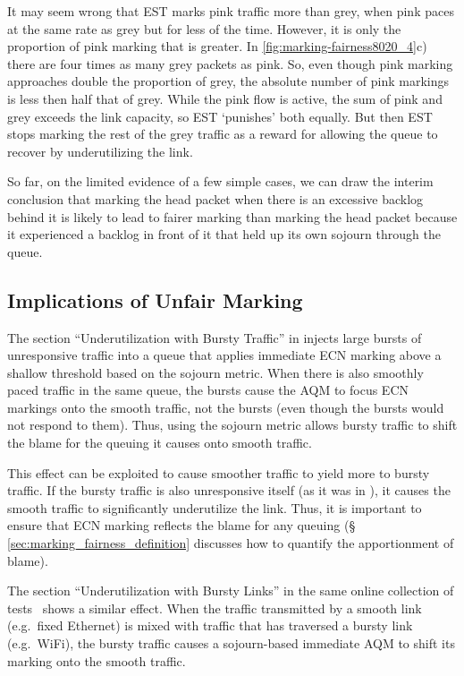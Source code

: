 It may seem wrong that EST marks pink traffic more than grey, when pink paces at the same rate as grey but for less of the time. However, it is only the proportion of pink marking that is greater. In \autoref{fig:marking-fairness8020_4}c) there are four times as many grey packets as pink. So, even though pink marking approaches double the proportion of grey, the absolute number of pink markings is less then half that of grey. While the pink flow is active, the sum of pink and grey exceeds the link capacity, so EST `punishes' both equally. But then EST stops marking the rest of the grey traffic as a reward for allowing the queue to recover by underutilizing the link.

So far, on the limited evidence of a few simple cases, we can draw the interim conclusion that marking the head packet when there is an excessive backlog behind it is likely to lead to fairer marking than marking the head packet because it experienced a backlog in front of it that held up its own sojourn through the queue. 

\subsection{Implications of Unfair Marking}\label{sec:effects_unfair_marking}

The section ``Underutilization with Bursty Traffic'' in \cite{Heist20:L4S_tests} injects large bursts of unresponsive traffic into a queue that applies immediate ECN marking above a shallow threshold based on the sojourn metric. When there is also smoothly paced traffic in the same queue, the bursts cause the AQM to focus ECN markings onto the smooth traffic, not the bursts (even though the bursts would not respond to them). Thus, using the sojourn metric allows bursty traffic to shift the blame for the queuing it causes onto smooth traffic.

This effect can be exploited to cause smoother traffic to yield more to bursty traffic. If the bursty traffic is also unresponsive itself (as it was in \cite{Heist20:L4S_tests}), it causes the smooth traffic to significantly underutilize the link. Thus, it is important to ensure that ECN marking reflects the blame for any queuing (\S\,\ref{sec:marking_fairness_definition} discusses how to quantify the apportionment of blame).

The section ``Underutilization with Bursty Links'' in the same online collection of tests~\cite{Heist20:L4S_tests} shows a similar effect. When the traffic transmitted by a smooth link (e.g.\ fixed Ethernet) is mixed with traffic that has traversed a bursty link (e.g.\ WiFi), the bursty traffic causes a sojourn-based immediate AQM to shift its marking onto the smooth traffic.

